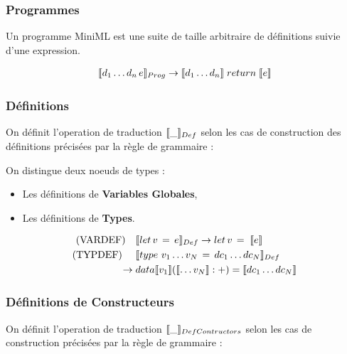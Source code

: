 \documentclass[12pt]{article}
\begin{document}
\hypertarget{programmes-1}{%
      \subsubsection*{Programmes}\label{programmes-1}}

Un programme MiniML est une suite de taille arbitraire de définitions suivie d'une expression.

\begin{align*}
      \llbracket d_1 \dots d_n \, e \rrbracket_{Prog} \rightarrow \llbracket d_1 \dots d_n \rrbracket\; return \; \llbracket e \rrbracket
\end{align*}

\subsubsection*{Définitions}\label{def}

On définit l'operation de traduction \(\llbracket \_ \rrbracket_{Def}\) selon les cas de construction
des définitions précisées par la règle de grammaire : 

On distingue deux noeuds de types :
\begin{itemize}
      \tightlist
      \item
            Les définitions de \textbf{Variables Globales},
      \item
            Les définitions de \textbf{Types}.
\end{itemize}
\begin{align*}
      \text{(VARDEF)}  \quad & \llbracket let \, v \, = \, e \rrbracket_{Def} \rightarrow   let \, v \, = \; \llbracket e \rrbracket       \\
      \text{(TYPDEF) } \quad & \llbracket type \, \, v_1 \dots v_N \, = \, dc_1 \dots  dc_N \rrbracket_{Def}                           \\
      \rightarrow \;         & data \llbracket v_1 \rrbracket (\llbracket \dots v_N \rrbracket : +) = \llbracket dc_1 \dots dc_N \rrbracket \\
\end{align*}
\subsubsection*{Définitions de Constructeurs}\label{defConstruct} \hfill \break

On définit l'operation de traduction \(\llbracket \_ \rrbracket_{DefContructors}\) selon les cas de construction précisées par la règle de grammaire : 
\end{document}
